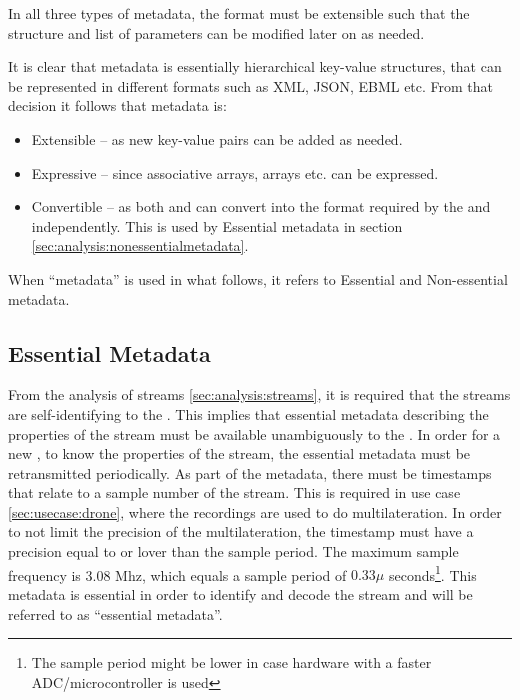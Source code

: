 In all three types of metadata, the format must be extensible such that the structure and list of parameters can be modified later on as needed.

It is clear that metadata is essentially hierarchical key-value structures, that can be represented in different formats such as XML, JSON, EBML etc.  From that decision it follows that metadata is:
\begin{itemize}
	\item Extensible -- as new key-value pairs can be added as needed.
	\item Expressive -- since associative arrays, arrays etc. can be expressed.
	\item Convertible -- as both  and  can convert into the format required by the  and  independently. This is used by Essential metadata in section \ref{sec:analysis:nonessentialmetadata}.
\end{itemize}

When ``metadata'' is used in what follows, it refers to Essential and Non-essential metadata.

\subsection{Essential Metadata} \label{sec:analysis:essentialmetadata}
From the analysis of streams \ref{sec:analysis:streams}, it is required that the streams are self-identifying to the . This implies that essential metadata describing the properties of the stream must be available unambiguously to the .
In order for a new , to know the properties of the stream, the essential metadata must be retransmitted periodically. As part of the metadata, there must be timestamps that relate to a sample number of the stream. This is required in use case \ref{sec:usecase:drone}, where the recordings are used to do multilateration. In order to not limit the precision of the multilateration, the timestamp must have a precision equal to or lover than the sample period. The maximum sample frequency is 3.08 Mhz, which equals a sample period of $0.33\mu$ seconds\footnote{The sample period might be lower in case hardware with a faster ADC/microcontroller is used}. This metadata is essential in order to identify and decode the stream and will be referred to as ``essential metadata''.


